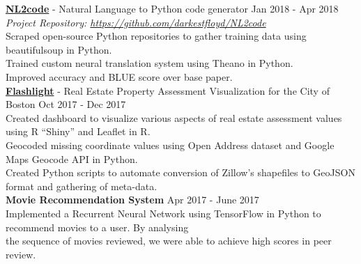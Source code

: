 \documentclass[a4paper]{article}
\newcommand{\mybullet}{
	\indent 
  \textbullet \hspace*{2mm}
}
\begin{document}
			\noindent
      \textbf{\href{https://github.com/darkestfloyd/NL2code}{NL2code}} - Natural Language to 
      Python code generator \hfill Jan 2018 - Apr 2018 \\
      \hfill \textit{Project Repository: \href{https://github.com/darkestfloyd/NL2code}{https://github.com/darkestfloyd/NL2code}}\\
      \mybullet Scraped open-source Python repositories to gather training data 
      using beautifulsoup in Python. \\
      \mybullet Trained custom neural translation system using Theano in Python. \\
      \mybullet Improved accuracy and BLUE score over base paper. \\

			\noindent
      \textbf{\href{https://sichenghao1992.shinyapps.io/DS5110/}{Flashlight}} - Real Estate 
      Property Assessment Visualization for the City of Boston \hfill Oct 2017 - Dec 2017 \\
      \mybullet Created dashboard to visualize various aspects of real estate assessment values 
      using R ``Shiny'' and Leaflet in R. \\
      \mybullet Geocoded missing coordinate values using Open Address dataset and Google Maps Geocode API in Python. \\
      \mybullet Created Python scripts to automate conversion of Zillow's shapefiles to GeoJSON format and gathering of meta-data. \\ 
			
			\noindent
			\textbf{Movie Recommendation System} \hfill Apr 2017 - June 2017\\
			\mybullet Implemented a Recurrent Neural Network using TensorFlow in Python to recommend 
      movies to a user. By analysing \\ \hspace*{9mm} the sequence of movies reviewed, we were 
      able to achieve high scores in peer review. \\ 
\end{document}
